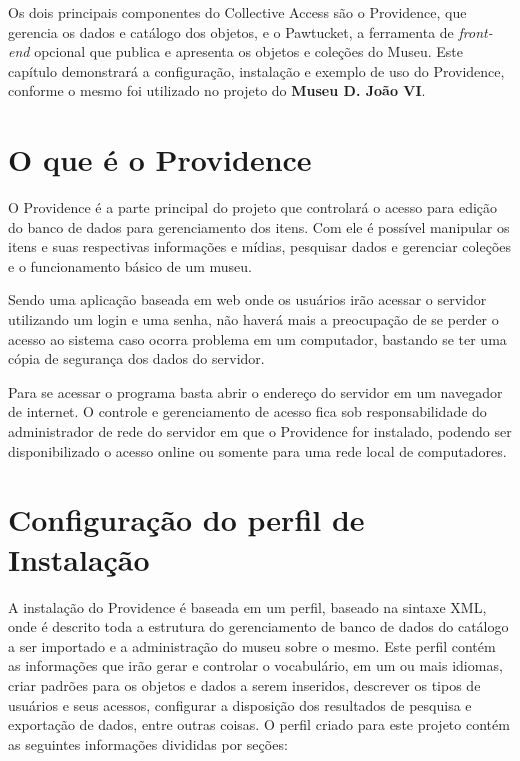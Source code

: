 \documentclass[a4paper,12pt,oneside,onecolumn,final,fleqn]{repUERJ}
\begin{document}
Os dois principais componentes do Collective Access são o Providence, que gerencia os dados e catálogo dos objetos, e o Pawtucket, a ferramenta de \textit{front-end} opcional que publica e apresenta os objetos e coleções do Museu. Este capítulo demonstrará a configuração, instalação e exemplo de uso do Providence, conforme o mesmo foi utilizado no projeto do \textbf{Museu D. João VI}.

\section{O que é o Providence}

O Providence é a parte principal do projeto que controlará o acesso para edição do banco de dados para gerenciamento dos itens. Com ele é possível manipular os itens e suas respectivas informações e mídias, pesquisar dados e gerenciar coleções e o funcionamento básico de um museu.

Sendo uma aplicação baseada em web onde os usuários irão acessar o servidor utilizando um login e uma senha, não haverá mais a preocupação de se perder o acesso ao sistema caso ocorra problema em um computador, bastando se ter uma cópia de segurança dos dados do servidor. 

Para se acessar o programa basta abrir o endereço do servidor em um navegador de internet. O controle e gerenciamento de acesso fica sob responsabilidade do administrador de rede do servidor em que o Providence for instalado, podendo ser disponibilizado o acesso online ou somente para uma rede local de computadores.

\section{Configuração do perfil de Instalação}

A instalação do Providence é baseada em um perfil, baseado na sintaxe XML, onde é descrito toda a estrutura do gerenciamento de banco de dados do catálogo a ser importado e a administração do museu sobre o mesmo. Este perfil contém as informações que irão gerar e controlar o vocabulário, em um ou mais idiomas, criar padrões para os objetos e dados a serem inseridos, descrever os tipos de usuários e seus acessos, configurar a disposição dos resultados de pesquisa e exportação de dados, entre outras coisas. O perfil criado para este projeto contém as seguintes informações divididas por seções: 
\end{document}
